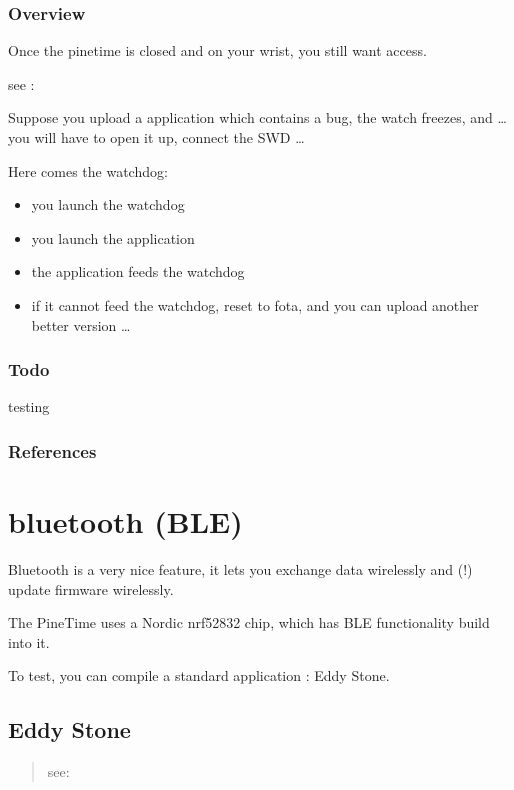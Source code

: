 \documentclass[letterpaper,10pt,english]{sphinxmanual}
\begin{document}
\subsection{Overview}
\label{\detokenize{drivers/watchdog:overview}}
Once the pinetime is closed and on your wrist, you still want access.

see : {\hyperref[\detokenize{fota/fota:fota}]{}}

Suppose you upload a application which contains a bug, the watch freezes, and … you will have to open it up, connect the SWD …

Here comes the watchdog:
\begin{itemize}
\item {} 
you launch the watchdog

\item {} 
you launch the application

\item {} 
the application feeds the watchdog

\item {} 
if it cannot feed the watchdog, reset to fota, and you can upload another better version …

\end{itemize}


\subsection{Todo}
\label{\detokenize{drivers/watchdog:todo}}
testing


\subsection{References}
\label{\detokenize{drivers/watchdog:references}}

\chapter{bluetooth (BLE)}
\label{\detokenize{bluetooth:bluetooth-ble}}\label{\detokenize{bluetooth::doc}}
Bluetooth is a very nice feature, it lets you exchange data wirelessly and (!) update firmware wirelessly.

The PineTime uses a Nordic nrf52832 chip, which has BLE functionality build into it.

To test, you can compile a standard application : Eddy Stone.


\section{Eddy Stone}
\label{\detokenize{bluetooth:eddy-stone}}\begin{quote}

see:   
\end{quote}
\end{document}
